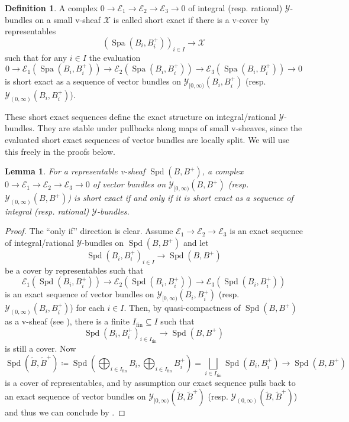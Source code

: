 \documentclass[10pt,twoside]{article}
\numberwithin{equation}{section}
\theoremstyle{plain}
\newtheorem{mylemma}[mythm]{Lemma}
\theoremstyle{definition}
\newtheorem{mydef}[mythm]{Definition}
\DeclareMathOperator{\Spa}{Spa}
\DeclareMathOperator{\Spd}{Spd}
\newcommand{\MCE}{\mathcal{E}}
\newcommand{\MCX}{\mathcal{X}}
\newcommand{\MCY}{\mathcal{Y}}
\DeclareMathOperator{\fin}{fin}
\newcommand{\Yco}{\MCY_{[0,\infty)}}
\newcommand{\Yoo}{\MCY_{(0,\infty)}}
\begin{document}
\begin{mydef}\label{defExactnessOfVBundles}
A complex \(0\to\MCE_1\to\MCE_2\to\MCE_3\to0\) of integral (resp. rational) \(\MCY\)-bundles on a small v-sheaf \(\MCX\) is called short exact if there is a v-cover by representables
\[(\Spa(B_i,B^+_i))_{i\in I}\longrightarrow \MCX\]
such that for any \(i\in I\) the evaluation 
    \[0\longrightarrow\MCE_1(\Spa(B_i,B^+_i))\longrightarrow\MCE_2(\Spa(B_i,B^+_i))\longrightarrow\MCE_3(\Spa(B_i,B^+_i))\longrightarrow0\]
    is short exact as a sequence of vector bundles on \(\Yco(B_i,B_i^+)\) (resp. \(\Yoo(B_i,B_i^+)\)).

\end{mydef}

These short exact sequences define the exact structure on integral/rational \(\MCY\)-bundles. They are stable under pullbacks along maps of small v-sheaves, since the evaluated short exact sequences of vector bundles are locally split. We will use this freely in the proofs below.

\begin{mylemma}\label{exactnessVBundleYBundleEquivalence}
     For a representable v-sheaf \(\Spd(B,B^+)\), a complex \(0\to\MCE_1\to\MCE_2\to\MCE_3\to0\) of vector bundles on \(\Yco(B,B^+)\) (resp. \(\Yoo(B,B^+)\)) is short exact if and only if it is short exact as a sequence of integral (resp. rational) \(\MCY\)-bundles.
\end{mylemma}

\begin{proof}
The ``only if'' direction is clear. Assume \(\MCE_1\to\MCE_2\to\MCE_3\) is an exact sequence of integral/rational \(\MCY\)-bundles on \(\Spd(B,B^+)\) and let  
 \[\Spd(B_i,B_i^+)_{i\in I}\longrightarrow \Spd(B,B^+)\] be a cover by representables such that 
 \[\MCE_1(\Spd(B_i,B_i^+))\longrightarrow \MCE_2(\Spd(B_i,B_i^+))\longrightarrow \MCE_3(\Spd(B_i,B_i^+))\]
 is an exact sequence of vector bundles on \(\Yco(B_i,B_i^+)\) (resp. \(\Yoo(B_i,B_i^+)\)) for each \(i\in I\). Then, by quasi-compactness of \(\Spd(B,B^+)\) as a v-sheaf (see \cite[Chapter 15]{etCohDiamonds}), there is a finite \(I_{\fin}\subseteq I\) such that
 \[\Spd(B_i,B_i^+)_{i\in I_{\fin}}\longrightarrow \Spd(B,B^+)\]
 is still a cover. Now 
 \[\Spd(\tilde B,\tilde B^+)\coloneqq\Spd\left(\bigoplus_{i\in I_{\fin}} B_i, \bigoplus_{i\in I_{\fin}} B_i^+\right)=\bigsqcup_{i\in I_{\fin}} \Spd(B_i,B_i^+) \longrightarrow \Spd(B,B^+) \]
 is a cover of representables, and by assumption our exact sequence pulls back to an exact sequence of vector bundles on \(\Yco(\tilde B,\tilde B^+)\) (resp. \(\Yoo(\tilde B,\tilde B^+)\)) and thus we can conclude by .
\end{proof}
\end{document}

